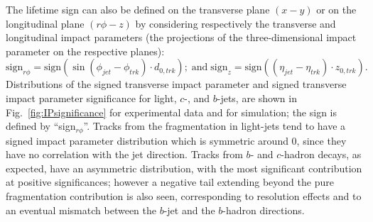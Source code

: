 The lifetime sign can also be defined on the transverse plane $(x-y)$ or on the longitudinal plane $(r\phi-z)$ by considering respectively the transverse and longitudinal impact parameters (the projections of the three-dimensional impact parameter on the respective planes):
%
\begin{equation}
\mbox{sign}_{r\phi} = \mbox{sign}(\sin(\phi_{jet} - \phi_{trk})\cdot d_{0,trk}); \; \mbox{and} \; \mbox{sign}_{z} = \mbox{sign}((\eta_{jet} - \eta_{trk})\cdot z_{0,trk}).
\end{equation}
%
Distributions of the signed transverse impact parameter and signed transverse impact parameter significance for light, $c$-, and $b$-jets, are shown in Fig.~\ref{fig:IPsignificance} for experimental data and for simulation; the sign %
 is defined by ``sign$_{r\phi}$''. %
Tracks from the fragmentation in light-jets tend to have a signed impact parameter distribution which is symmetric around 0, since they have no correlation with the jet direction. Tracks from $b$- and $c$-hadron decays, as expected, have an asymmetric distribution, with the most significant contribution at positive significances; however a negative tail extending beyond the pure fragmentation contribution is also seen, corresponding to resolution effects and to an eventual mismatch between the $b$-jet and the $b$-hadron directions. 



